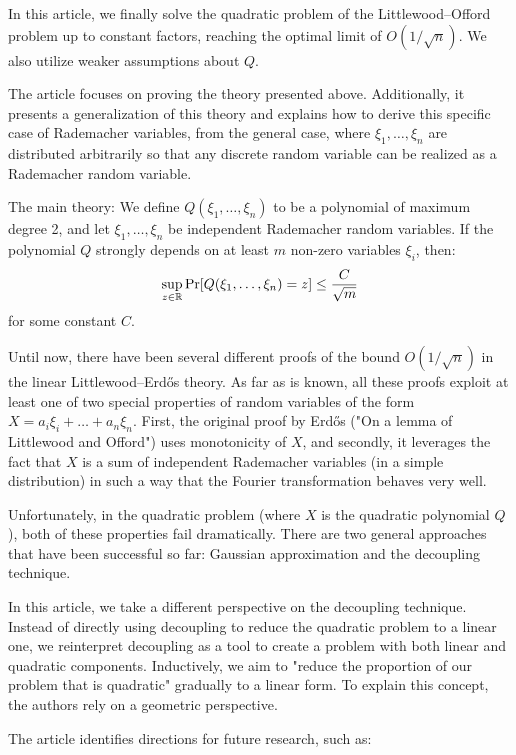 In this article, we finally solve the quadratic problem of the Littlewood–Offord problem up to constant factors, reaching the optimal limit of $O(1/\sqrt{n})$. We also utilize weaker assumptions about $Q$.
 
The article focuses on proving the theory presented above. Additionally, it presents a generalization of this theory and explains how to derive this specific case of Rademacher variables, from the general case, where $\xi_1,\ldots,\xi_n$ are distributed arbitrarily so that any discrete random variable can be realized as a Rademacher random variable.
 
The main theory: We define $Q(\xi_1,\ldots,\xi_n)$ to be a polynomial of maximum degree 2, and let $\xi_1,\ldots,\xi_n$ be independent Rademacher random variables. If the polynomial $Q$ strongly depends on at least $m$ non-zero variables $\xi_i$, then:
\vspace{-0.36\baselineskip}
\[ \sup_{z\in\mathbb{R}} \Pr[Q(\xi_1,\ldots,\xi_n) = z] \leq \frac{C}{\sqrt{m}} \vspace{-0.5\baselineskip} \] for some constant $C$.
 
Until now, there have been several different proofs of the bound $O(1/\sqrt{n})$ in the linear Littlewood–Erdős theory. As far as is known, all these proofs exploit at least one of two special properties of random variables of the form $X = a_i \xi_i + \ldots + a_n \xi_n$. First, the original proof by Erdős ("On a lemma of Littlewood and Offord") uses monotonicity of $X$, and secondly, it leverages the fact that $X$ is a sum of independent Rademacher variables (in a simple distribution) in such a way that the Fourier transformation behaves very well.
 
Unfortunately, in the quadratic problem (where $X$ is the quadratic polynomial $Q$), both of these properties fail dramatically. There are two general approaches that have been successful so far: Gaussian approximation and the decoupling technique.
 
In this article, we take a different perspective on the decoupling technique. Instead of directly using decoupling to reduce the quadratic problem to a linear one, we reinterpret decoupling as a tool to create a problem with both linear and quadratic components. Inductively, we aim to "reduce the proportion of our problem that is quadratic" gradually to a linear form. To explain this concept, the authors rely on a geometric perspective.
  
\vspace{\baselineskip}
The article identifies directions for future research, such as:
 
